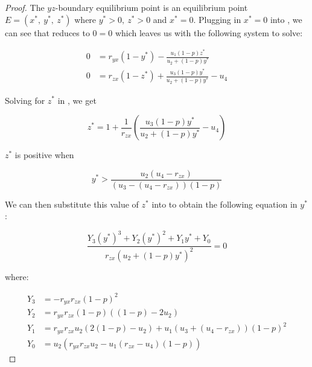 \begin{proof}
    The $yz$-boundary equilibrium point is an equilibrium point $E=\left(x^*,\ y^*,\ z^*\right)$ where $y^*>0,\ z^*>0$ and $x^*=0$. Plugging in $x^*=0$ into , we can see that  reduces to $0=0$ which leaves us with the following system to solve:

    \begin{subequations}\label{system:yz-boundary}
        \begin{align}
            0 &= r_{yx}\left(1-y^*\right)-\frac{u_1\left(1-p\right)z^*}{u_2+\left(1-p\right)y^*} \label{eq:yz-boundary-y}\\
            0 &= r_{zx}\left(1-z^*\right)+\frac{u_3\left(1-p\right)y^*}{u_2+\left(1-p\right)y^*}-u_4 \label{eq:yz-boundary-z}
        \end{align}
    \end{subequations}

    Solving for $z^*$ in , we get
    
    \begin{equation*}
        z^*=1+\frac{1}{r_{zx}}\left(\frac{u_3\left(1-p\right)y^*}{u_2+\left(1-p\right)y^*}-u_4\right)
    \end{equation*}
    
    $z^*$ is positive when

    \begin{equation*}
        y^*>\frac{u_2\left(u_4-r_{zx}\right)}{\left(u_3-\left(u_4-r_{zx}\right)\right)\left(1-p\right)}
    \end{equation*}

    We can then substitute this value of $z^*$ into  to obtain the following equation in $y^*$:

    \begin{equation}\label{eq:yz-Y-vars}
        \frac{Y_3\left(y^*\right)^3+Y_2\left(y^*\right)^2+Y_1y^*+Y_0}{r_{zx}\left(u_2+\left(1-p\right)y^*\right)^2}=0
    \end{equation}

    where:

    \begin{align*}
        Y_3 &= -r_{yx}r_{zx}\left(1-p\right)^2\\
        Y_2 &= r_{yx}r_{zx}\left(1-p\right)\left(\left(1-p\right)-2u_2\right)\\
        Y_1 &= r_{yx}r_{zx}u_2\left(2\left(1-p\right)-u_2\right)+u_1\left(u_3+\left(u_4-r_{zx}\right)\right)\left(1-p\right)^2\\
        Y_0 &= u_2\left(r_{yx}r_{zx}u_2-u_1\left(r_{zx}-u_4\right)\left(1-p\right)\right)
    \end{align*}


\end{proof}
